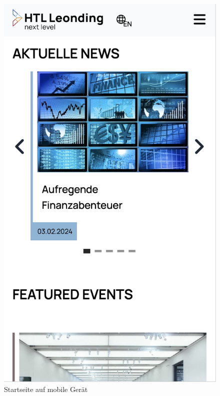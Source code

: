 \begin{figure}
   \begin{minipage}[b]{.4\linewidth} 
      \includegraphics[width=\linewidth]{pics/start mobile.png}
      \caption{Startseite auf mobile Gerät}
      \label{fig:impl:mobile:start}
   \end{minipage}
   \hspace{.05\linewidth}
   \begin{minipage}[b]{.4\linewidth}

\end{minipage}
\end{figure}
